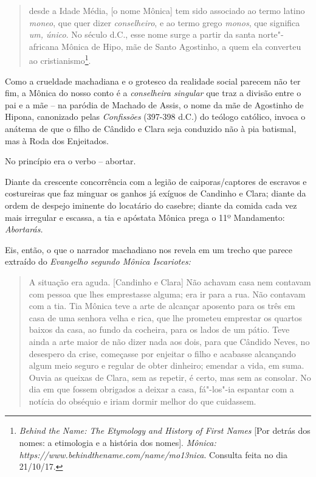 \begin{quote}
desde a Idade Média, [o nome Mônica] tem sido associado ao termo
latino \emph{moneo}, que quer dizer \emph{conselheiro}, e ao termo grego
\emph{monos}, que significa \emph{um, único}. No século  d.C., esse
nome surge a partir da santa norte"-africana Mônica de Hipo, mãe de Santo
Agostinho, a quem ela converteu ao cristianismo\footnote{\emph{Behind
  the Name: The Etymology and History of First Names} [Por detrás dos
  nomes: a etimologia e a história dos nomes]. \emph{Mônica: https://www.behindthename.com/name/mo13nica}.
  Consulta feita no dia 21/10/17.}.
\end{quote}

Como a crueldade machadiana e o grotesco da realidade social parecem não
ter fim, a Mônica do nosso conto é a \emph{conselheira singular} que
traz a divisão entre o pai e a mãe -- na paródia de Machado de Assis, o
nome da mãe de Agostinho de Hipona, canonizado pelas \emph{Confissões}
(397-398 d.C.) do teólogo católico, invoca o anátema de que o filho de
Cândido e Clara seja conduzido não à pia batismal, mas à Roda dos
Enjeitados.

No princípio era o verbo -- abortar.

Diante da crescente concorrência com a legião de caiporas/captores de
escravos e costureiras que faz minguar os ganhos já exíguos de Candinho
e Clara; diante da ordem de despejo iminente do locatário do casebre;
diante da comida cada vez mais irregular e escassa, a tia e apóstata
Mônica prega o 11º Mandamento: \emph{Abortarás. }

Eis, então, o que o narrador machadiano nos revela em um trecho que
parece extraído do \emph{Evangelho segundo Mônica Iscariotes: }

\begin{quote}
A situação era aguda. {[}Candinho e Clara{]} Não achavam casa nem
contavam com pessoa que lhes emprestasse alguma; era ir para a rua. Não
contavam com a tia. Tia Mônica teve a arte de alcançar aposento para os
três em casa de uma senhora velha e rica, que lhe prometeu emprestar os
quartos baixos da casa, ao fundo da cocheira, para os lados de um pátio.
Teve ainda a arte maior de não dizer nada aos dois, para que Cândido
Neves, no desespero da crise, começasse por enjeitar o filho e acabasse
alcançando algum meio seguro e regular de obter dinheiro; emendar a
vida, em suma. Ouvia as queixas de Clara, sem as repetir, é certo, mas
sem as consolar. No dia em que fossem obrigados a deixar a casa,
fá"-los"-ia espantar com a notícia do obséquio e iriam dormir melhor do
que cuidassem.
\end{quote}

